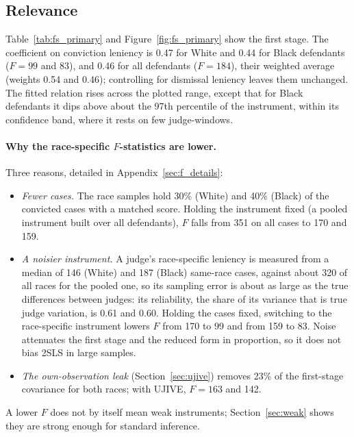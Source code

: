 \documentclass[11pt]{article}
\begin{document}
\subsection{Relevance}\label{sec:relevance}

Table~\ref{tab:fs_primary} and Figure~\ref{fig:fs_primary} show the first stage. The coefficient on conviction leniency is 0.47 for White and 0.44 for Black defendants ($F = 99$ and 83), and 0.46 for all defendants ($F = 184$), their weighted average (weights 0.54 and 0.46); controlling for dismissal leniency leaves them unchanged. The fitted relation rises across the plotted range, except that for Black defendants it dips above about the 97th percentile of the instrument, within its confidence band, where it rests on few judge-windows.

\paragraph{Why the race-specific $F$-statistics are lower.} Three reasons, detailed in Appendix~\ref{sec:f_details}:
\begin{itemize}
  \item \emph{Fewer cases.} The race samples hold 30\% (White) and 40\% (Black) of the convicted cases with a matched score. Holding the instrument fixed (a pooled instrument built over all defendants), $F$ falls from 351 on all cases to 170 and 159.
  \item \emph{A noisier instrument.} A judge's race-specific leniency is measured from a median of 146 (White) and 187 (Black) same-race cases, against about 320 of all races for the pooled one, so its sampling error is about as large as the true differences between judges: its reliability, the share of its variance that is true judge variation, is 0.61 and 0.60. Holding the cases fixed, switching to the race-specific instrument lowers $F$ from 170 to 99 and from 159 to 83. Noise attenuates the first stage and the reduced form in proportion, so it does not bias 2SLS in large samples.
  \item \emph{The own-observation leak} (Section~\ref{sec:ujive}) removes 23\% of the first-stage covariance for both races; with UJIVE, $F = 163$ and 142.
\end{itemize}
A lower $F$ does not by itself mean weak instruments; Section~\ref{sec:weak} shows they are strong enough for standard inference.
\end{document}
